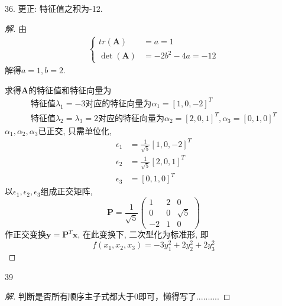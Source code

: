 \documentclass[10pt,a4paper]{report}
\def\*#1{\mathbf{#1}}
\begin{document}
36. 更正: 特征值之积为-12.
\begin{proof}[解]
	由
	\begin{align*}
	\begin{cases}
	tr(\*A) &= a = 1 \\
	\det(\*A) &= -2b^2 - 4a = -12 
	\end{cases}
	\end{align*}
	解得$a = 1, b = 2$.
	
	求得$\*A$的特征值和特征向量为
	\begin{align*}
	\text{特征值}\lambda_1 = -3\text{对应的特征向量为}\alpha_1 = [1, 0, -2]^T \\
	\text{特征值}\lambda_2 = \lambda_3 = 2 \text{对应的特征向量为} \alpha_2 = [2, 0, 1]^T, \alpha_3 = [0, 1, 0]^T
	\end{align*}
	$\alpha_1, \alpha_2, \alpha_3$已正交, 只需单位化, 
	\begin{align*}
	\epsilon_1 &= \frac{1}{\sqrt{5}}[1, 0, -2]^T \\
	\epsilon_2 &= \frac{1}{\sqrt{5}}[2, 0, 1]^T \\
	\epsilon_3 &= [0, 1, 0]^T
	\end{align*}
	以$\epsilon_1, \epsilon_2, \epsilon_3$组成正交矩阵,
	\[\*P = \frac{1}{\sqrt{5}} \begin{pmatrix}
	1 & 2 & 0 \\
	0 & 0 & \sqrt{5} \\
	-2 & 1 & 0
	\end{pmatrix}\]
	作正交变换$\*y = \*P^T \*x$, 在此变换下, 二次型化为标准形, 即
	\[ f(x_1, x_2, x_3) = -3y_1^2 + 2y_2^2 + 2y_3^2 \]
\end{proof}
39
\begin{proof}[解]
	判断是否所有顺序主子式都大于0即可，懒得写了..........
\end{proof}
\end{document}
